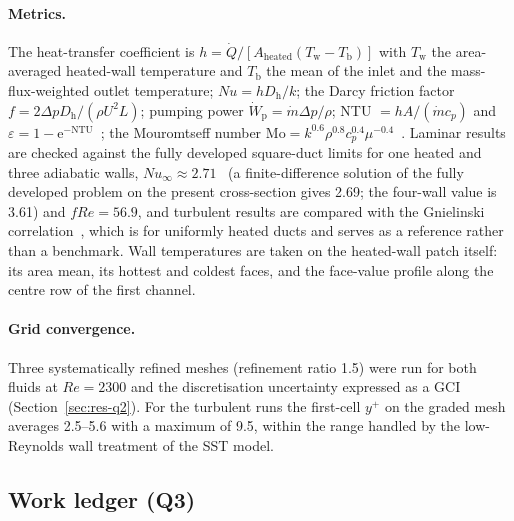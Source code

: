 \documentclass[preprint,12pt]{elsarticle}
\renewcommand{\Re}{\mathit{Re}}
\newcommand{\Nu}{\mathit{Nu}}
\begin{document}
\paragraph{Metrics.} The heat-transfer coefficient is
$h=\dot Q/[A_{\mathrm{heated}}(T_{\mathrm w}-T_{\mathrm b})]$ with $T_{\mathrm w}$ the
area-averaged heated-wall temperature and $T_{\mathrm b}$ the mean of the inlet and the
mass-flux-weighted outlet temperature; $\Nu=hD_{\mathrm h}/k$; the Darcy friction factor
$f=2\Delta p D_{\mathrm h}/(\rho U^2L)$; pumping power $\dot W_{\mathrm p}=\dot m\Delta p/\rho$;
NTU $=hA/(\dot m c_p)$ and $\varepsilon=1-\mathrm e^{-\mathrm{NTU}}$~\cite{42-KaysLondon1984}; the
Mouromtseff number $\mathrm{Mo}=k^{0.6}\rho^{0.8}c_p^{0.4}\mu^{-0.4}$~\cite{40-Mouromtseff1942}. Laminar results are checked against the
fully developed square-duct limits for one heated and three adiabatic walls,
$\Nu_\infty\approx2.71$~\cite{39-ShahLondon1978} (a finite-difference solution of the fully
developed problem on the present cross-section gives 2.69; the four-wall value is 3.61) and
$f\Re=56.9$, and turbulent results are compared with the Gnielinski
correlation~\cite{Gnielinski1976}, which is for uniformly heated ducts and serves as a
reference rather than a benchmark. Wall temperatures are taken on the heated-wall patch
itself: its area mean, its hottest and coldest faces, and the face-value profile along the
centre row of the first channel.

\paragraph{Grid convergence.} Three systematically refined meshes (refinement ratio 1.5) were
run for both fluids at $\Re=2300$ and the discretisation uncertainty expressed as a GCI~\cite{45-Celik2008GCI} (Section~\ref{sec:res-q2}). For the turbulent runs the
first-cell $y^+$ on the graded mesh averages 2.5--5.6 with a maximum of 9.5, within the range handled
by the low-Reynolds wall treatment of the SST model.

\subsection{Work ledger (Q3)}
\label{sec:ledger-method}
\end{document}
